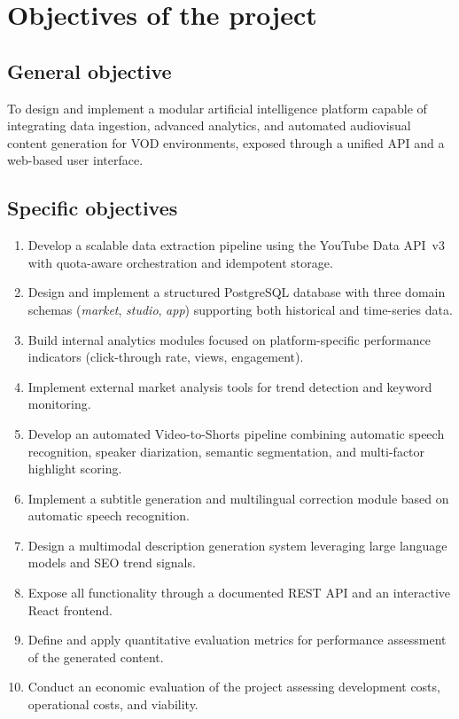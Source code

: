 \documentclass[ENG]{TFUOC}
\begin{document}
\section{Objectives of the project}

\subsection*{General objective}

To design and implement a modular artificial intelligence platform capable of integrating data ingestion, advanced analytics, and automated audiovisual content generation for VOD environments, exposed through a unified API and a web-based user interface.

\subsection*{Specific objectives}

\begin{enumerate}
\item Develop a scalable data extraction pipeline using the YouTube Data API~v3 with quota-aware orchestration and idempotent storage.
\item Design and implement a structured PostgreSQL database with three domain schemas (\textit{market}, \textit{studio}, \textit{app}) supporting both historical and time-series data.
\item Build internal analytics modules focused on platform-specific performance indicators (click-through rate, views, engagement).
\item Implement external market analysis tools for trend detection and keyword monitoring.
\item Develop an automated Video-to-Shorts pipeline combining automatic speech recognition, speaker diarization, semantic segmentation, and multi-factor highlight scoring.
\item Implement a subtitle generation and multilingual correction module based on automatic speech recognition.
\item Design a multimodal description generation system leveraging large language models and SEO trend signals.
\item Expose all functionality through a documented REST API and an interactive React frontend.
\item Define and apply quantitative evaluation metrics for performance assessment of the generated content.
\item Conduct an economic evaluation of the project assessing development costs, operational costs, and viability.
\end{enumerate}
\end{document}
